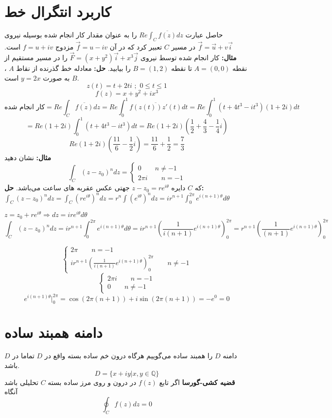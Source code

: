 \documentclass[12pt]{report}
\begin{document}
	 \section{کاربرد انتگرال خط}
	 حاصل عبارت
	 $Re \int_{C} \overline{f(z)} dz$
	 را به عنوان مقدار کار انجام شده بوسیله نیروی
	 $\vec{f} = \vec{u} + v \vec{i}$
	 در مسیر 
	 $C$
	 تعبیر کرد که در آن 
	 $\vec{f} = u - iv$
	 مزدوج
	 $f = u + iv$
	است.
	\textbf{مثال:}
	کار انجام شده توسط نیروی
	$\vec{F} = (x+y^2) \vec{i} + x^3 \vec{j}$
	را در مسیر مستقیم از نقطه 
	$A = (0, 0)$
	تا نقطه 
	$B=(1, 2)$
	را بیابید.
	\textbf{حل:}
	معادله خط گذرنده از نقاط 
	$A$
	،
	$B$
	به صورت 
	$y = 2x$
	است.
	$$z(t) = t + 2ti \,\,;\,\, 0 \leq t\leq 1$$
	$$f(z) = x + y^2 + ix^3$$
	$$\text{کار انجام شده} = Re\int_{C} \overline{f(z)} dz = Re\int_{0}^{1} \overline{f(z(t)) z'(t)} dt = Re\int_{0}^{1} (t + 4t^3 - it^3)(1 + 2i)dt$$
	$$=Re(1 + 2i)\int_{0}^{1} (t + 4t^3 - it^3)dt =Re(1 + 2i)(\frac{1}{2} + \frac{4}{3} - \frac{1}{4} i) $$
	$$Re(1 + 2i)(\frac{11}{6} - \frac{1}{2}i) = \frac{11}{6} + \frac{1}{2} = \frac{7}{3}$$
	\newline
	\textbf{مثال:}
	نشان دهید
	\[
	\int_{C}(z - z_0)^n dz = 
	\begin{cases}
		0 \qquad n \neq -1\\
		2\pi i \qquad n = -1
	\end{cases}
	\]
	که 
	$C$
	 دایره
	 $z - z_0 = re^{i\theta}$
	 جهتی عکس عقربه های ساعت می‌باشد.
	 \textbf{حل:}
	 $\int_{C} (z-z_0)^n dz = \int_{C} (re^{i\theta})^n dz = r^n \int (e^{i\theta})^n dz = ir^{n+1} \int_{0}^{2\pi} e^{i(n+1)\theta} d\theta$
	 
	 $z = z_0 + re^{i\theta} \Rightarrow dz = ire^{i\theta}d\theta$
	 $$\int_{C} (z-z_0)^n dz = ir^{n+1} \int_{0}^{2\pi} e^{i(n+1)\theta}d\theta = ir^{n+1}(\frac{1}{i(n+1)} e^{i(n+1)\theta})_{0}^{2\pi}=r^{n+1}(\frac{1}{(n+1)} e^{i(n+1)\theta})_{0}^{2\pi}$$
	 
	 \[
	 \begin{cases}
	 	2\pi \qquad n = -1\\
	 	ir^{n+1}(\frac{1}{i(n+1)} e^{i(n+1)\theta})_{0}^{2\pi}\qquad n \neq -1
	 \end{cases}
	 \]
	 \[
	 \begin{cases}
	 	2\pi i \qquad n = -1\\
	 	0   \qquad n\neq -1
	 \end{cases}
	 \]
	 $$e^{i(n+1)\theta} \big|_{0}^{2\pi} = \cos(2\pi(n+1)) + i\sin(2\pi(n+1)) = -e^0 = 0$$
	 
	 \section{دامنه همبند ساده}
	 دامنه
	 $D$
	 را همبند ساده می‌گوییم هرگاه درون خم ساده بسته واقع در 
	 $D$
	 تماما در
	 $D$
	 باشد.
	 $$D= \{x + iy|x, y \in \mathbb{Q}\}$$
	 \newline
	 \textbf{قضیه کشی-گورسا}
	 اگر تابع
	 $f(z)$
	 در درون و روی مرز ساده بسته
	 $C$
	 تحلیلی باشد آنگاه
	 $$\oint_{C} f(z) dz = 0$$
	 
\end{document}
